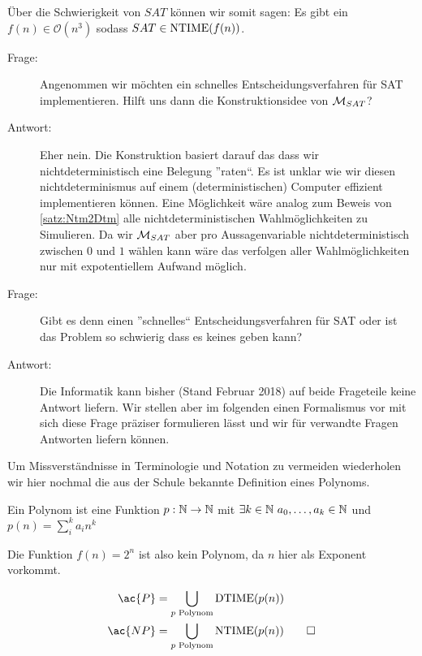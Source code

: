 Über die Schwierigkeit von $SAT$ können wir somit sagen:
Es gibt ein $f(n)\in\mathcal{O}(n^3)$ sodass $SAT\in\operatorname{NTIME}(f(n))$.



\begin{description}
 \item[Frage:] Angenommen wir möchten ein schnelles Entscheidungsverfahren für SAT implementieren. 
Hilft uns dann die Konstruktionsidee von $\mathcal{M}_{SAT}$?
 \item[Antwort:] Eher nein. 
Die Konstruktion basiert darauf das dass wir nichtdeterministisch eine Belegung ''raten``.
Es ist unklar wie wir diesen nichtdeterminismus auf einem (deterministischen) Computer effizient implementieren können.
Eine Möglichkeit wäre analog zum Beweis von \autoref{satz:Ntm2Dtm} alle nichtdeterministischen Wahlmöglichkeiten zu Simulieren.
Da wir $\mathcal{M}_{SAT}$ aber pro Aussagenvariable nichtdeterministisch zwischen $0$ und $1$ wählen kann wäre das verfolgen aller Wahlmöglichkeiten nur mit expotentiellem Aufwand möglich.
\end{description}

\begin{description}
 \item[Frage:] Gibt es denn einen ''schnelles`` Entscheidungsverfahren für SAT oder ist das Problem so schwierig dass es keines geben kann?
 \item[Antwort:] Die Informatik kann bisher (Stand Februar 2018) auf beide Frageteile keine Antwort liefern. 
 Wir stellen aber im folgenden einen Formalismus vor mit sich diese Frage präziser formulieren lässt und wir für verwandte Fragen Antworten liefern können.
\end{description}


Um Missverständnisse in Terminologie und Notation zu vermeiden wiederholen wir hier nochmal die aus der Schule bekannte Definition eines Polynoms.

\begin{Def}[name={[Polynom]}]
	Ein Polynom ist eine Funktion $p:\N\->\N$ mit $\exists k\in \mathbb{N}\ a_0,\dots,a_k\in\mathbb{N}$ und \mbox{$p(n)=\sum_i^k a_in^k$}
\end{Def}
\begin{Bemerkung}
 Die Funktion $f(n)=2^n$ ist also kein Polynom, da $n$ hier als Exponent vorkommt.
\end{Bemerkung}

\begin{Def}
 \begin{align*}
  \ac{P} &= \bigcup_{p\text{ Polynom}} \DTIME(p(n)) \\
  \ac{NP} &= \bigcup_{p\text{ Polynom}} \NTIME(p(n))
  \qedhere
 \end{align*}
\end{Def}

